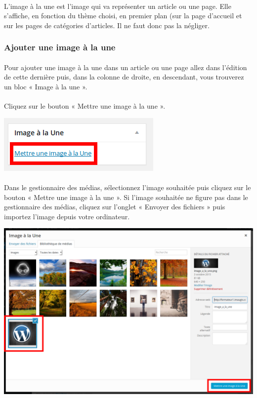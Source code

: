 \documentclass[10pt,a4paper]{article}
\begin{document}
\paragraph{}L'image à la une est l'image qui va représenter un article ou une page. Elle s'affiche, en fonction du thème choisi, en premier plan (sur la page d'accueil et sur les pages de catégories d'articles. Il ne faut donc pas la négliger.
\subsubsection{Ajouter une image à la une}
\paragraph{}Pour ajouter une image à la une dans un article ou une page allez dans l'édition de cette dernière puis, dans la colonne de droite, en descendant, vous trouverez un bloc « Image à la une ».
\paragraph{}Cliquez sur le bouton « Mettre une image à la une ».
\begin{center}
\includegraphics[scale=0.3]{img/0098.png}
\end{center}
\paragraph{}Dans le gestionnaire des médias, sélectionnez l'image souhaitée puis cliquez sur le bouton « Mettre une image à la une ». Si l'image souhaitée ne figure pas dans le gestionnaire des médias, cliquez sur l'onglet « Envoyer des fichiers » puis importez l'image depuis votre ordinateur.
\begin{center}
\includegraphics[scale=0.25]{img/0099.png}
\end{center}
\end{document}
